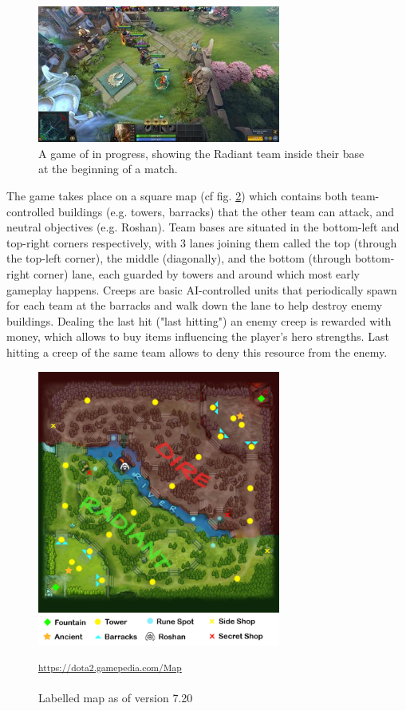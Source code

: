 \begin{figure}[H]
 \centering
 \captionsetup{justification=centering, margin=0.5cm}
 \includegraphics[width=8cm]{images/Dota_2_Gameplay_Aug_2017.jpg}
\caption{A game of \dota in progress, showing the Radiant team inside their base at the beginning of a match. \cite{wiki:dota}}
 \label{fig:dota-2-game}
\end{figure}

The game takes place on a square map (cf fig. \ref{fig:dota-2-map}) which contains both team-controlled buildings (e.g. towers, barracks) that the other team can attack, and neutral objectives (e.g. Roshan). Team bases are situated in the bottom-left and top-right corners respectively, with 3 lanes joining them called the top (through the top-left corner), the middle (diagonally), and the bottom (through bottom-right corner) lane, each guarded by towers and around which most early gameplay happens. Creeps are basic AI-controlled units that periodically spawn for each team at the barracks and walk down the lane to help destroy enemy buildings. Dealing the last hit ("last hitting") an enemy creep is rewarded with money, which allows to buy items influencing the player's hero strengths. Last hitting a creep of the same team allows to deny this resource from the enemy. 

\begin{figure}[H]
 \centering
 \captionsetup{justification=centering, margin=0.5cm}
 \includegraphics[width=8cm]{images/dota-map.png}
\caption{Labelled \dota map as of version 7.20}
 \small\textsuperscript{\url{https://dota2.gamepedia.com/Map}}
 \label{fig:dota-2-map}
\end{figure}

